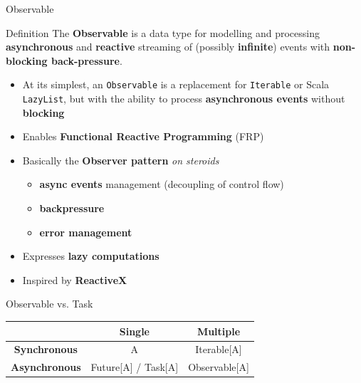 \documentclass[presentation, 9pt]{beamer}\mode<presentation>{\usetheme{AMSBolognaFC}}
\begin{document}
\begin{frame}{Observable \href{https://monix.io/docs/current/reactive/observable.html}{\faLink}}
	\begin{alertblock}{Definition}
		The \textbf{Observable} is a data type for modelling and processing \textbf{asynchronous} and \textbf{reactive} streaming of (possibly \textbf{infinite}) events with \textbf{non-blocking back-pressure}.
	\end{alertblock}
	\begin{itemize}
			\item At its simplest, an \texttt{Observable} is a replacement for \texttt{Iterable} or Scala \texttt{LazyList}, but with the ability to process \textbf{asynchronous events} without \textbf{blocking}
		\item Enables \textbf{Functional Reactive Programming} (FRP) 
	   \item Basically the \textbf{Observer pattern} \emph{on steroids}
	   \begin{itemize}
				\item \textbf{async events} management (decoupling of control flow)
			\item \textbf{backpressure} 
			\item \textbf{error management}
		 \end{itemize}
	   \item Expresses \textbf{lazy computations}
	   \item Inspired by \textbf{ReactiveX} \href{https://reactivex.io/intro.html}{\faLink}
	\end{itemize}
	\begin{alertblock}{Observable vs. Task}
		\begin{table}[]
			\centering
			\begin{tabular}{|c|c|c|}
			\hline
									 & \textbf{Single}                      & \textbf{Multiple}          \\ \hline
			\textbf{Synchronous}  & A                           & Iterable{[}A{]}   \\ \hline
			\textbf{Asynchronous} & Future{[}A{]} / Task{[}A{]} & Observable{[}A{]} \\ \hline
			\end{tabular}
			\end{table}
	\end{alertblock}
\end{frame}
\end{document}
